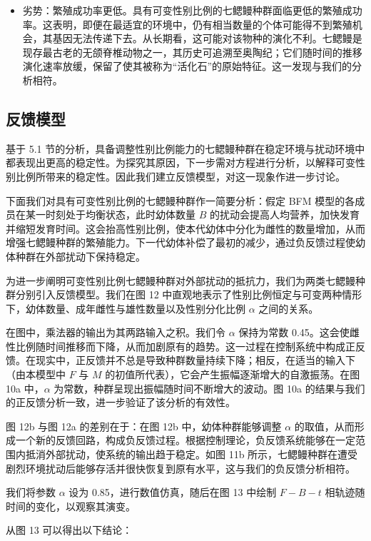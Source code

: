 \documentclass[11pt,a4paper]{ctexart}
\begin{document}
\begin{itemize}
\item 劣势：繁殖成功率更低。具有可变性别比例的七鳃鳗种群面临更低的繁殖成功率。这表明，即便在最适宜的环境中，仍有相当数量的个体可能得不到繁殖机会，其基因无法传递下去。从长期看，这可能对该物种的演化不利。七鳃鳗是现存最古老的无颌脊椎动物之一，其历史可追溯至奥陶纪；它们随时间的推移演化速率放缓，保留了使其被称为“活化石”的原始特征。这一发现与我们的分析相符。
\end{itemize}

\subsection{反馈模型}

基于 5.1 节的分析，具备调整性别比例能力的七鳃鳗种群在稳定环境与扰动环境中都表现出更高的稳定性。为探究其原因，下一步需对方程进行分析，以解释可变性别比例所带来的稳定性。因此我们建立反馈模型，对这一现象作进一步讨论。

下面我们对具有可变性别比例的七鳃鳗种群作一简要分析：假定 BFM 模型的各成员在某一时刻处于均衡状态，此时幼体数量 $B$ 的扰动会提高人均营养，加快发育并缩短发育时间。这会抬高性别比例，使本代幼体中分化为雌性的数量增加，从而增强七鳃鳗种群的繁殖能力。下一代幼体补偿了最初的减少，通过负反馈过程使幼体种群在外部扰动下保持稳定。

为进一步阐明可变性别比例七鳃鳗种群对外部扰动的抵抗力，我们为两类七鳃鳗种群分别引入反馈模型。我们在图 12 中直观地表示了性别比例恒定与可变两种情形下，幼体数量、成年雌性与雄性数量以及性别分化比例 $\alpha$ 之间的关系。

在图中，乘法器的输出为其两路输入之积。我们令 $\alpha$ 保持为常数 0.45。这会使雌性比例随时间推移而下降，从而加剧原有的趋势。这一过程在控制系统中构成正反馈。在现实中，正反馈并不总是导致种群数量持续下降；相反，在适当的输入下（由本模型中 $F$ 与 $M$ 的初值所代表），它会产生振幅逐渐增大的自激振荡。在图 10a 中，$\alpha$ 为常数，种群呈现出振幅随时间不断增大的波动。图 10a 的结果与我们的正反馈分析一致，进一步验证了该分析的有效性。

图 12b 与图 12a 的差别在于：在图 12b 中，幼体种群能够调整 $\alpha$ 的取值，从而形成一个新的反馈回路，构成负反馈过程。根据控制理论，负反馈系统能够在一定范围内抵消外部扰动，使系统的输出趋于稳定。如图 11b 所示，七鳃鳗种群在遭受剧烈环境扰动后能够存活并很快恢复到原有水平，这与我们的负反馈分析相符。

我们将参数 $\alpha$ 设为 0.85，进行数值仿真，随后在图 13 中绘制 $F-B-t$ 相轨迹随时间的变化，以观察其演变。

从图 13 可以得出以下结论：
\end{document}
